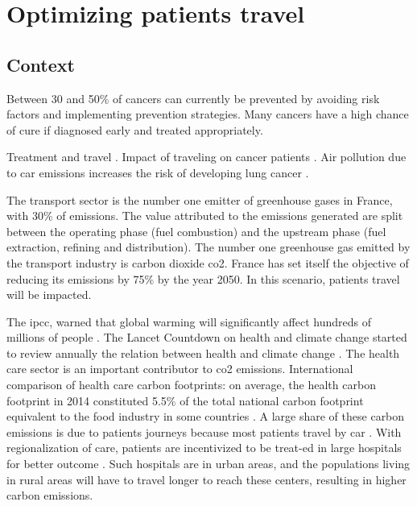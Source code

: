 \chapter{Optimizing patients travel}

\section{Context}

Between 30 and 50\% of cancers can currently be prevented by avoiding risk factors and implementing prevention strategies. Many cancers have a high chance of cure if diagnosed early and treated appropriately.

Treatment and travel \cite{weiss_global_2020,brundisini_chronic_2013,kelly_are_2016,salerno_understanding_2022}.
Impact of traveling on cancer patients \cite{payne_impact_2000,flytkjaer_virgilsen_cancer_2019,virgilsen_travel_2019,payne_impact_2000,ambroggi_distance_2015}.
Air pollution due to car emissions increases the risk of developing lung cancer \cite{raaschou-nielsen_air_2013}.

The transport sector is the number one emitter of greenhouse gases in France, with 30\% of emissions. The value attributed to the emissions generated are split between the operating phase (fuel combustion) and the upstream phase (fuel extraction, refining and distribution). The number one greenhouse gas emitted by the transport industry is carbon dioxide \ac{co2}.
France has set itself the objective of reducing its emissions by 75\% by the year 2050. In this scenario, patients travel will be impacted.

The \ac{ipcc}, warned that global warming will significantly affect hundreds of millions of people \cite{change_climate_2015}.
The Lancet Countdown on health and climate change started to review annually the relation between health and climate change \cite{watts_2020_2021}.
The health care sector is an important contributor to \ac{co2} emissions. International comparison of health care carbon footprints: on average, the health carbon footprint in 2014 constituted 5.5\% of the total national carbon footprint equivalent to the food industry in some countries \cite{pichler_international_2019}.
A large share of these carbon emissions is due to patients journeys \cite{andrews_carbon_2013,nicolet_what_2022} because most patients travel by car \cite{forner_carbon_2021}. With regionalization of care, patients are incentivized to be treat-ed in large hospitals for better outcome \cite{eskander_health_2016}. Such hospitals are in urban areas, and the populations living in rural areas will have to travel longer to reach these centers, resulting in higher carbon emissions.

